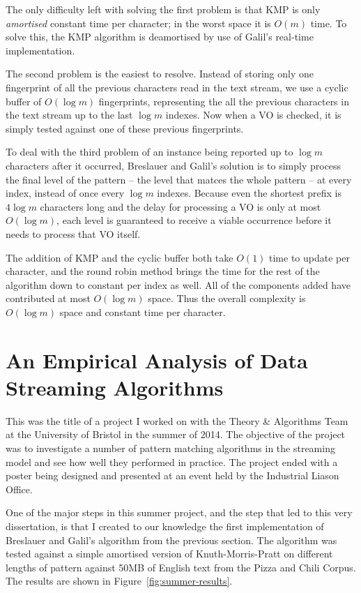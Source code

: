 \documentclass[ %
                    author={Dominic Joseph Moylett},
                    degree={MEng},
                     title={Dictionary Matching with Fingerprints},
                  subtitle={An Empirical Analysis},
                      type={research},
                      year={2015} ]{dissertation}
\begin{document}
The only difficulty left with solving the first problem is that KMP is only \textit{amortised} constant time per character; in the worst space it is $O(m)$ time. To solve this, the KMP algorithm is deamortised by use of Galil's\cite{Galil:1981:SMR:322234.322244} real-time implementation.

The second problem is the easiest to resolve. Instead of storing only one fingerprint of all the previous characters read in the text stream, we use a cyclic buffer of $O(\log m)$ fingerprints, representing the all the previous characters in the text stream up to the last $\log m$ indexes. Now when a VO is checked, it is simply tested against one of these previous fingerprints.

To deal with the third problem of an instance being reported up to $\log m$ characters after it occurred, Breslauer and Galil's solution is to simply process the final level of the pattern  --  the level that matces the whole pattern  --  at every index, instead of once every $\log m$ indexes. Because even the shortest prefix is $4\log m$ characters long and the delay for processing a VO is only at most $O(\log m)$, each level is guaranteed to receive a viable occurrence before it needs to process that VO itself.

The addition of KMP and the cyclic buffer both take $O(1)$ time to update per character, and the round robin method brings the time for the rest of the algorithm down to constant per index as well. All of the components added have contributed at most $O(\log m)$ space. Thus the overall complexity is $O(\log m)$ space and constant time per character.

\section{An Empirical Analysis of Data Streaming Algorithms}
\label{sec:summer}

This was the title of a project I worked on with the Theory \& Algorithms Team at the University of Bristol in the summer of 2014. The objective of the project was to investigate a number of pattern matching algorithms in the streaming model and see how well they performed in practice. The project ended with a poster being designed and presented at an event held by the Industrial Liason Office.

One of the major steps in this summer project, and the step that led to this very dissertation, is that I created to our knowledge the first implementation of Breslauer and Galil's algorithm from the previous section. The algorithm was tested against a simple amortised version of Knuth-Morris-Pratt on different lengths of pattern against 50MB of English text from the Pizza and Chili Corpus. The results are shown in Figure~\ref{fig:summer-results}.
\end{document}
